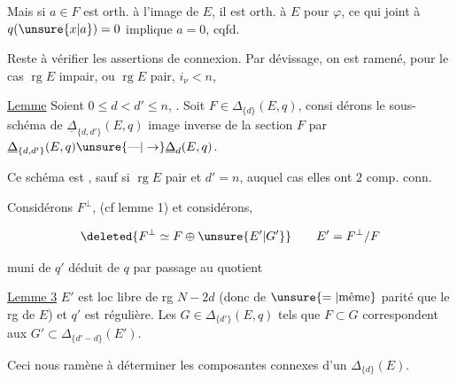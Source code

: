 Mais  si $a\in F$ est orth. à l'image de $E$, il est orth. à $E$ pour $\varphi$,  ce qui joint à $q(\unsure{x|a})=0$ implique $a=0$, cqfd.

Reste à vérifier les assertions de connexion. Par dévissage, on est ramené, pour le cas  $\operatorname{rg}E$ impair, ou $\operatorname{rg}E$ pair, $i_\nu<n$, 


\uline{Lemme}  Soient $0\leq d<d'\leq n$,  . Soit $F\in\Delta_{\{d\}}(E,q)$, consi%
%
dérons le sous-schéma de $\underline\Delta_{\{d,d'\}}(E,q)$  image inverse de la section $F$ par $\underline\Delta_{\{d,d'\}}(E,q)\unsure{\text{---}|\to}\underline\Delta_d(E,q)$.

Ce schéma est  ,  sauf si $\operatorname{rg}E$ pair et $d'=n$, auquel cas elles ont $2$ comp. conn.


Considérons $F^\perp$, (cf lemme 1) et considérons, 

\[
 \deleted{F^\perp\simeq F\oplus\unsure{E'|G'}}\qquad E'=F^\perp/F
\]

muni de $q'$ déduit de $q$ par passage au quotient

 \uline{Lemme 3}   $E'$ est loc libre  de rg $N-2d$ (donc de $\unsure{=|\text{même}}$ parité que le rg de $E$) et $q'$ est régulière. Les $G\in\Delta_{\{d'\}}(E,q)$ tels que $F\subset G$ correspondent  aux $G'\subset\Delta_{\{d'-d\}}(E')$.

Ceci nous ramène à déterminer les composantes connexes d'un $\Delta_{\{d\}}(E)$.

